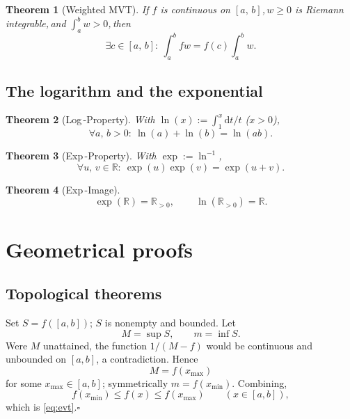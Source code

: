 \documentclass[11pt,reqno]{amsart}
\makeatletter
\providecommand{\R}{\mathbb{R}}
\newcommand{\comma}{,\,\allowbreak}
\theoremstyle{redplain}
\newtheorem{theorem}{Theorem}
\renewenvironment{proof}[1][Proof]{\noindent\textbf{#1.}\ }{\ }
\renewenvironment{proof}[1][\proofname]{%
	\proof@ORIG[#1]\mbox{}\par\nobreak
}{%
	\endproof@ORIG
}
\makeatother
\begin{document}
\begin{theorem}[Weighted MVT]
	\label{thm:weighted-mvt}
	If $f$ is continuous on $[a\comma b]$\comma $w\ge0$ is Riemann integrable\comma and $\int_a^b w>0$\comma then
	\begin{equation}\label{eq:weighted-mvt}
	\exists c\in[a\comma b]:\ \int_a^b fw=f(c)\int_a^b w.
	\end{equation}
\end{theorem}

\subsection{The logarithm and the exponential}

\begin{theorem}[Log\,-Property]
	\label{thm:log}
	With $\ln(x):=\int_1^x \mathrm{d}t/t$ ($x>0$)\comma
	\begin{equation}\label{eq:log}
	\forall a\comma b>0:\ \ln(a)+\ln(b)=\ln(ab).
	\end{equation}
\end{theorem}

\begin{theorem}[Exp\,-Property]
	\label{thm:exp}
	With $\exp:=\ln^{-1}$\comma
	\begin{equation}\label{eq:exp}
	\forall u\comma v\in\R:\ \exp(u)\exp(v)=\exp(u+v).
	\end{equation}
\end{theorem}

\begin{theorem}[Exp\,-Image]
	\label{thm:image}
	\begin{equation}\label{eq:image}
	\exp(\R)=\R_{>0}\comma\qquad \ln(\R_{>0})=\R.
	\end{equation}
\end{theorem}
\section{Geometrical proofs}
\subsection{Topological theorems}

\begin{proof}[Proof of \autoref{thm:evt}]
	Set $S=f([a,b])$; $S$ is nonempty and bounded. Let
	\[
	M=\sup S,\qquad m=\inf S.
	\]
	Were $M$ unattained, the function $1/(M-f)$ would be continuous and unbounded on $[a,b]$, a contradiction. Hence
	\[
	M=f(x_{\max})
	\]
	for some $x_{\max}\in[a,b]$; symmetrically $m=f(x_{\min})$. Combining,
	\[
	f(x_{\min})\le f(x)\le f(x_{\max})\qquad(x\in[a,b]),
	\]
	which is \autoref{eq:evt}.\hfill$\square$
\end{proof}
\end{document}
